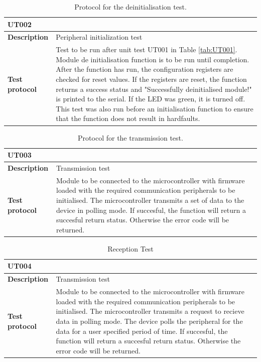 \begin{table}[H]
	\centering
	\caption{Protocol for the deinitialisation test.}
	\label{tab:UT002}
	\begin{tabular}{m{} m{}}
		\multicolumn{2}{l}{\textbf{UT002} }\\
		\hline
		\textbf{Description} & Peripheral initialization test\\
		\hline
		\hline
		\textbf{Test protocol} & Test to be run after unit test UT001 in Table \ref{tab:UT001}. Module de initialisation function is to be run until completion. After the function has run, the configuration registers are checked for reset values. If the registers are reset, the function returns a success status and "Successfully deinitialised module!" is printed to the serial. If the LED was green, it is turned off. This test was also run before an initialisation function to ensure that the function does not result in hardfaults.\\
		\hline
		\hline
	\end{tabular}
\end{table}

\begin{table}[H]
	\centering
	\caption{Protocol for the transmission test.}
	\label{tab:UT003}
	\begin{tabular}{m{} m{}}
		\multicolumn{2}{l}{\textbf{UT003} }\\
		\hline
		\textbf{Description} & Transmission test\\
		\hline
		\hline
		\textbf{Test protocol} & Module to be connected to the microcontroller with firmware loaded with the required communication peripherals to be initialised. The microcontroller transmits a set of data to the device in polling mode. If succesful, the function will return a succesful return status. Otherwise the error code will be returned.  \\
		\hline
		\hline
	\end{tabular}
\end{table}

\begin{table}[H]
	\centering
	\caption{Reception Test}
	\label{tab:UT004}
	\begin{tabular}{m{} m{}}
		\multicolumn{2}{l}{\textbf{UT004} }\\
		\hline
		\textbf{Description} & Transmission test\\
		\hline
		\hline
		\textbf{Test protocol} & Module to be connected to the microcontroller with firmware loaded with the required communication peripherals to be initialised. The microcontroller transmits a request to recieve data in polling mode. The device polls the peripheral for the data for a user specified period of time. If succesful, the function will return a succesful return status. Otherwise the error code will be returned.    \\
		\hline
		\hline
	\end{tabular}
\end{table}

